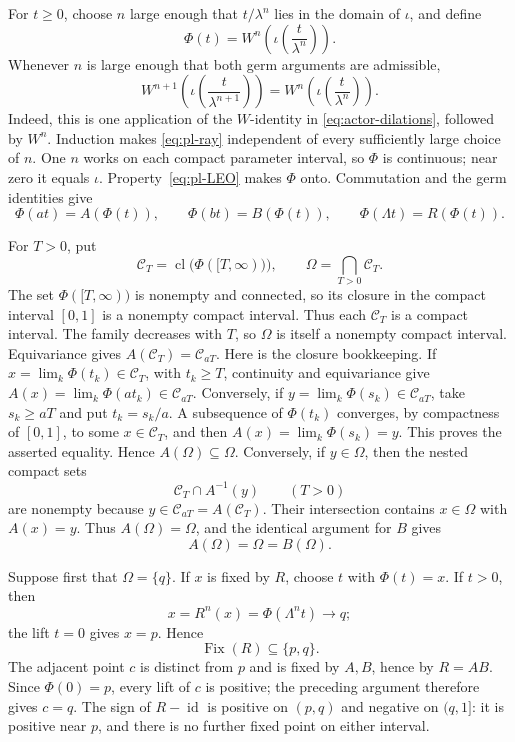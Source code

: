\documentclass[11pt]{article}
\theoremstyle{definition}
\theoremstyle{remark}
\newcommand{\I}{[0,1]}
\newcommand{\Fix}{\operatorname{Fix}}
\newcommand{\id}{\operatorname{id}}
\newcommand{\cl}{\operatorname{cl}}
\begin{document}
For \(t\geq0\), choose \(n\) large enough that \(t/\lambda^n\) lies in the
domain of \(\iota\), and define
\begin{equation}\label{eq:pl-ray}
 \Phi(t)=W^n\left(\iota\left(\frac{t}{\lambda^n}\right)\right).
\end{equation}
Whenever \(n\) is large enough that both germ arguments are admissible,
\[
 W^{n+1}\left(\iota\left(\frac{t}{\lambda^{n+1}}\right)\right)
 =W^n\left(\iota\left(\frac{t}{\lambda^n}\right)\right).
\]
Indeed, this is one application of the \(W\)-identity in
\eqref{eq:actor-dilations}, followed by \(W^n\).  Induction makes
\eqref{eq:pl-ray} independent of every sufficiently large choice of \(n\).
One \(n\) works on each compact
parameter interval, so \(\Phi\) is continuous; near zero it equals
\(\iota\).  Property~\eqref{eq:pl-LEO} makes \(\Phi\) onto.  Commutation
and the germ identities give
\begin{equation}\label{eq:pl-ray-equivariance}
 \Phi(at)=A(\Phi(t)),\qquad
 \Phi(bt)=B(\Phi(t)),\qquad
 \Phi(\Lambda t)=R(\Phi(t)).
\end{equation}

For \(T>0\), put
\[
 \mathcal C_T=\cl\bigl(\Phi([T,\infty))\bigr),\qquad
 \Omega=\bigcap_{T>0}\mathcal C_T.
\]
The set \(\Phi([T,\infty))\) is nonempty and connected, so its closure in
the compact interval \(\I\) is a nonempty compact interval.  Thus each
\(\mathcal C_T\) is a compact interval.  The family decreases with \(T\), so
\(\Omega\) is itself a nonempty compact interval.  Equivariance gives
\(A(\mathcal C_T)=\mathcal C_{aT}\).  Here is the closure bookkeeping.
If \(x=\lim_k\Phi(t_k)\in\mathcal C_T\), with \(t_k\geq T\), continuity and
equivariance give
\(A(x)=\lim_k\Phi(at_k)\in\mathcal C_{aT}\).  Conversely, if
\(y=\lim_k\Phi(s_k)\in\mathcal C_{aT}\), take \(s_k\geq aT\) and put
\(t_k=s_k/a\).  A subsequence of \(\Phi(t_k)\) converges, by compactness of
\(\I\), to some \(x\in\mathcal C_T\), and then
\(A(x)=\lim_k\Phi(s_k)=y\).  This proves the asserted equality.  Hence
\(A(\Omega)\subseteq\Omega\).  Conversely, if \(y\in\Omega\), then the
nested compact sets
\[
 \mathcal C_T\cap A^{-1}(y)\qquad(T>0)
\]
are nonempty because \(y\in\mathcal C_{aT}=A(\mathcal C_T)\).  Their
intersection contains \(x\in\Omega\) with \(A(x)=y\).  Thus
\(A(\Omega)=\Omega\), and the identical argument for \(B\) gives
\begin{equation}\label{eq:pl-Omega-invariant}
 A(\Omega)=\Omega=B(\Omega).
\end{equation}

Suppose first that \(\Omega=\{q\}\).  If \(x\) is fixed by \(R\), choose
\(t\) with \(\Phi(t)=x\).  If \(t>0\), then
\[
 x=R^n(x)=\Phi(\Lambda^nt)\longrightarrow q;
\]
the lift \(t=0\) gives \(x=p\).  Hence
\[
 \Fix(R)\subseteq\{p,q\}.
\]
The adjacent point \(c\) is distinct from \(p\) and is fixed by \(A,B\),
hence by \(R=AB\).  Since \(\Phi(0)=p\), every lift of \(c\) is positive;
the preceding argument therefore gives \(c=q\).
The sign of \(R-\id\) is positive on \((p,q)\) and negative on
\((q,1]\): it is positive near \(p\), and there is no further fixed point
on either interval.
\end{document}
